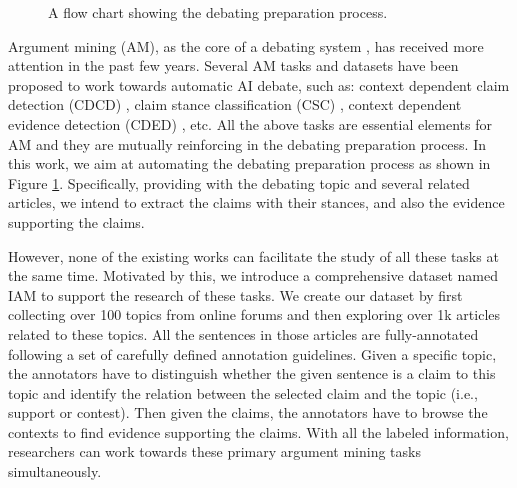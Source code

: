 \documentclass[11pt]{article}
\begin{document}
\begin{figure}[t!]
\caption{\label{fig:flow} A flow chart showing the debating preparation process. }
\end{figure}

Argument mining (AM), as the core of a debating system \cite{bar2021advances, yuan2021overview}, has received more attention in the past few years.
Several AM tasks and datasets have been proposed to work towards automatic AI debate, such as: context dependent claim detection (CDCD) \cite{levy2014context}, claim stance classification (CSC) \cite{bar2017stance, chen2019seeing}
, context dependent evidence detection (CDED) \cite{rinott2015show}, etc.
All the above tasks are essential elements for AM and they are mutually reinforcing in the debating preparation process.
In this work, we aim at automating the debating preparation process as shown in Figure \ref{fig:flow}. 
Specifically, providing with the debating topic and several related articles, we intend to extract the claims with their stances, and also the evidence supporting the claims.

However, none of the existing works can facilitate the study of all these tasks at the same time.
Motivated by this, we introduce a comprehensive dataset named IAM to support the research of these tasks.
We create our dataset by first collecting over 100 topics from online forums and then exploring over 1k articles related to these topics. 
All the sentences in those articles are fully-annotated following a set of carefully defined annotation guidelines.
Given a specific topic, the annotators have to distinguish whether the given sentence is a claim to this topic and identify the relation between the selected claim and the topic (i.e., support or contest).
Then given the claims, the annotators have to browse the contexts to find evidence supporting the claims.
With all the labeled information, researchers can work towards these primary argument mining tasks simultaneously.
\end{document}

